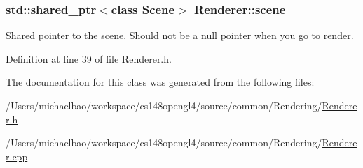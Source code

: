 \subsubsection[{scene}]{\setlength{\rightskip}{0pt plus 5cm}std\+::shared\+\_\+ptr$<$class {\bf Scene}$>$ Renderer\+::scene\hspace{0.3cm}{\ttfamily [protected]}}\label{class_renderer_a65178695d48824d3afd6fe40fd4915b6}


Shared pointer to the scene. Should not be a null pointer when you go to render. 



Definition at line 39 of file Renderer.\+h.



The documentation for this class was generated from the following files\+:\begin{DoxyCompactItemize}
\item 
/\+Users/michaelbao/workspace/cs148opengl4/source/common/\+Rendering/\hyperlink{_renderer_8h}{Renderer.\+h}\item 
/\+Users/michaelbao/workspace/cs148opengl4/source/common/\+Rendering/\hyperlink{_renderer_8cpp}{Renderer.\+cpp}\end{DoxyCompactItemize}
